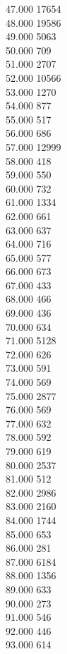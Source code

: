{ 47.000	17654 \\
 48.000	19586 \\
 49.000	5063 \\
 50.000	709 \\
 51.000	2707 \\
 52.000	10566 \\
 53.000	1270 \\
 54.000	877 \\
 55.000	517 \\
 56.000	686 \\
 57.000	12999 \\
 58.000	418 \\
 59.000	550 \\
 60.000	732 \\
 61.000	1334 \\
 62.000	661 \\
 63.000	637 \\
 64.000	716 \\
 65.000	577 \\
 66.000	673 \\
 67.000	433 \\
 68.000	466 \\
 69.000	436 \\
 70.000	634 \\
 71.000	5128 \\
 72.000	626 \\
 73.000	591 \\
 74.000	569 \\
 75.000	2877 \\
 76.000	569 \\
 77.000	632 \\
 78.000	592 \\
 79.000	619 \\
 80.000	2537 \\
 81.000	512 \\
 82.000	2986 \\
 83.000	2160 \\
 84.000	1744 \\
 85.000	653 \\
 86.000	281 \\
 87.000	6184 \\
 88.000	1356 \\
 89.000	633 \\
 90.000	273 \\
 91.000	546 \\
 92.000	446 \\
 93.000	614 \\
}

